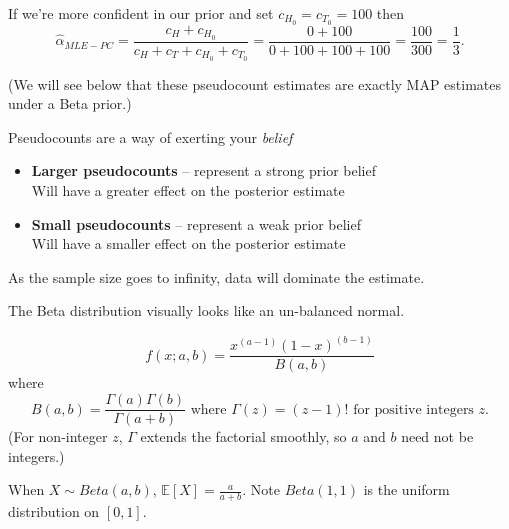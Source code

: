 If we're more confident in our prior and set  $c_{H_0}=c_{T_0}=100$ then
\[\hat\alpha_{MLE-PC} = \frac{c_H+c_{H_0}}{c_H+c_T+c_{H_0}+c_{T_0}}=\frac{0+100}{0+100+100+100} = \frac{100}{300} = \frac{1}{3}.\]

(We will see below that these pseudocount estimates are exactly MAP estimates under a Beta prior.)

Pseudocounts are a way of exerting your \textit{belief}
\begin{itemize}
\item[] \textbf{Larger pseudocounts} – represent a strong prior belief\\\hspace*{3em}
Will have a greater effect on the posterior estimate
\item[] \textbf{Small pseudocounts} – represent a weak prior belief\\\hspace*{3em}
Will have a smaller effect on the posterior estimate
\end{itemize}

As the sample size goes to infinity, data will dominate the estimate.

\begin{aside}
The Beta distribution visually looks like an un-balanced normal. 

\begin{center}
\end{center}

\[f(x;a, b) = \frac{x^{(a-1)}(1-x)^{(b-1)}}{B(a,b)}\]
where 
\[B(a,b) = \frac{\Gamma(a)\Gamma(b)}{\Gamma(a+b)}\text{ where } \Gamma(z) = (z-1)!\text{ for positive integers } z.\]
(For non-integer $z$, $\Gamma$ extends the factorial smoothly, so $a$ and $b$ need not be integers.)

When $X\sim Beta(a, b)$, $\mathbb{E}[X] = \frac{a}{a + b}$. Note $Beta(1,1)$ is the uniform distribution on $[0,1]$.

\end{aside}

